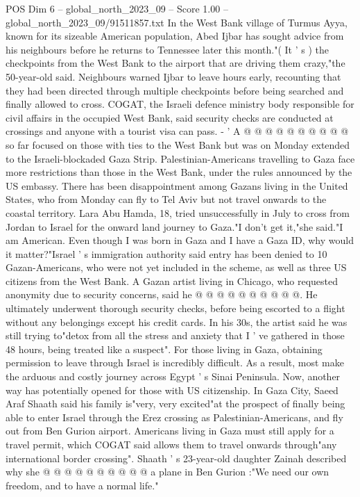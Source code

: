 \begin{textsample}{POS Dim 6 – global\_north\_2023\_09 – Score 1.00 – global\_north\_2023\_09/91511857.txt}
In the West Bank village of Turmus Ayya, known for its sizeable American population, Abed Ijbar has sought advice from his neighbours before he returns to Tennessee later this month."( It ' s ) the checkpoints from the West Bank to the airport that are driving them crazy,"the 50-year-old said.
Neighbours warned Ijbar to leave hours early, recounting that they had been directed through multiple checkpoints before being searched and finally allowed to cross.
COGAT, the Israeli defence ministry body responsible for civil affairs in the occupied West Bank, said security checks are conducted at crossings and anyone with a tourist visa can pass. - ' A @ @ @ @ @ @ @ @ @ @ so far focused on those with ties to the West Bank but was on Monday extended to the Israeli-blockaded Gaza Strip.
Palestinian-Americans travelling to Gaza face more restrictions than those in the West Bank, under the rules announced by the US embassy.
There has been disappointment among Gazans living in the United States, who from Monday can fly to Tel Aviv but not travel onwards to the coastal territory.
Lara Abu Hamda, 18, tried unsuccessfully in July to cross from Jordan to Israel for the onward land journey to Gaza."I don't get it,"she said."I am American.
Even though I was born in Gaza and I have a Gaza ID, why would it matter?"Israel ' s immigration authority said entry has been denied to 10 Gazan-Americans, who were not yet included in the scheme, as well as three US citizens from the West Bank.
A Gazan artist living in Chicago, who requested anonymity due to security concerns, said he @ @ @ @ @ @ @ @ @ @.
He ultimately underwent thorough security checks, before being escorted to a flight without any belongings except his credit cards.
In his 30s, the artist said he was still trying to"detox from all the stress and anxiety that I ' ve gathered in those 48 hours, being treated like a suspect".
For those living in Gaza, obtaining permission to leave through Israel is incredibly difficult.
As a result, most make the arduous and costly journey across Egypt ' s Sinai Peninsula.
Now, another way has potentially opened for those with US citizenship.
In Gaza City, Saeed Araf Shaath said his family is"very, very excited"at the prospect of finally being able to enter Israel through the Erez crossing as Palestinian-Americans, and fly out from Ben Gurion airport.
Americans living in Gaza must still apply for a travel permit, which COGAT said allows them to travel onwards through"any international border crossing".
Shaath ' s 23-year-old daughter Zainah described why she @ @ @ @ @ @ @ @ @ @ a plane in Ben Gurion :"We need our own freedom, and to have a normal life."

\end{textsample}
